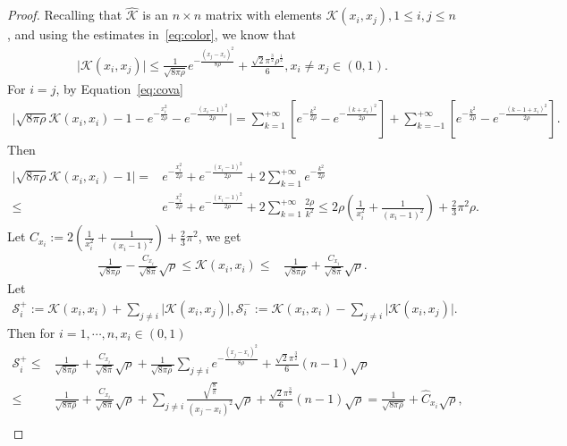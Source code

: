\documentclass[11pt]{article}
\numberwithin{equation}{section}%
\numberwithin{figure}{section}%
\theoremstyle{remark}
\begin{document}
	\begin{proof}
		Recalling that $\hat{\mathcal{K}}$ is an $n\times n$ matrix with elements $\mathcal{K}(x_{i},x_{j}),1\leq i,j\leq n$, and using the estimates in~\eqref{eq:color}, we know that
		\begin{align*}
		\vert\mathcal{K}(x_{i},x_{j}) \vert\leq
		\frac{1}{\sqrt{8\pi\rho}}e^{-\frac{(x_{j}-x_{i})^{2}}{8\rho}}+\frac{\sqrt{2}\pi^{\frac{3}{2}}\rho^{\frac{1}{2}}}{6},x_{i}\neq x_{j}\in(0,1).
		\end{align*}
		For $i=j$, by Equation~\eqref{eq:cova}~
		\begin{align*}
			\vert\sqrt{8\pi\rho}\mathcal{K}(x_{i},x_{i})-1-e^{-\frac{x_{i}^{2}}{2\rho}}-e^{-\frac{(x_{i}-1)^{2}}{2\rho}}\vert=\sum_{k=1}^{+\infty}\left[e^{-\frac{k^{2}}{2\rho}}-e^{-\frac{(k+x_{i})^{2}}{2\rho}}\right]+\sum_{k=-1}^{+\infty}\left[e^{-\frac{k^{2}}{2\rho}}-e^{-\frac{(k-1+x_{i})^{2}}{2\rho}}\right].
		\end{align*}	
		Then
			\begin{align*}
			\vert\sqrt{8\pi\rho}\mathcal{K}(x_{i},x_{i})-1\vert=&e^{-\frac{x_{i}^{2}}{2\rho}}+e^{-\frac{(x_{i}-1)^{2}}{2\rho}}+2\sum_{k=1}^{+\infty}e^{-\frac{k^{2}}{2\rho}}\\
			\leq& e^{-\frac{x_{i}^{2}}{2\rho}}+e^{-\frac{(x_{i}-1)^{2}}{2\rho}}+2\sum_{k=1}^{+\infty}\frac{2\rho}{k^{2}}
			\leq2\rho(\frac{1}{x_{i}^{2}}+\frac{1}{(x_{i}-1)^{2}})+\frac{2}{3}\pi^{2}\rho.
		\end{align*}	
		Let $C_{x_{i}}:=2(\frac{1}{x_{i}^{2}}+\frac{1}{(x_{i}-1)^{2}})+\frac{2}{3}\pi^{2}$,
		we get
		\begin{align}\label{eq:cx}
			\frac{1}{\sqrt{8\pi\rho}}-\frac{C_{x_{i}}}{\sqrt{8\pi}}\sqrt{\rho}\leq\mathcal{K}(x_{i},x_{i})\leq&\frac{1}{\sqrt{8\pi\rho}}+\frac{C_{x_{i}}}{\sqrt{8\pi}}\sqrt{\rho}.
		\end{align}	
		Let
			\begin{align*}
		\mathcal{S}^{+}_{i}:=\mathcal{K}(x_{i},x_{i})+\sum_{j\neq i}\vert\mathcal{K}(x_{i},x_{j}) \vert,\mathcal{S}^{-}_{i}:=\mathcal{K}(x_{i},x_{i})-\sum_{j\neq i}\vert\mathcal{K}(x_{i},x_{j}) \vert.
		\end{align*}	
		Then for $i=1,\cdots,n,x_{i}\in(0,1)$
			\begin{align*}
			\mathcal{S}^{+}_{i}\leq&\frac{1}{\sqrt{8\pi\rho}}+\frac{C_{x_{i}}}{\sqrt{8\pi}}\sqrt{\rho}+\frac{1}{\sqrt{8\pi\rho}}\sum_{j\neq i}e^{-\frac{(x_{j}-x_{i})^{2}}{8\rho}}+\frac{\sqrt{2}\pi^{\frac{3}{2}}}{6}(n-1)\sqrt{\rho}\\
			\leq&\frac{1}{\sqrt{8\pi\rho}}+\frac{C_{x_{i}}}{\sqrt{8\pi}}\sqrt{\rho}+\sum_{j\neq i}\frac{\sqrt{\frac{8}{\pi}}}{(x_{j}-x_{i})^{2}}\sqrt{\rho}+\frac{\sqrt{2}\pi^{\frac{3}{2}}}{6}(n-1)\sqrt{\rho}=\frac{1}{\sqrt{8\pi\rho}}+\hat{C}_{x_{i}}\sqrt{\rho},\\

\end{align*}
\end{proof}
\end{document}

